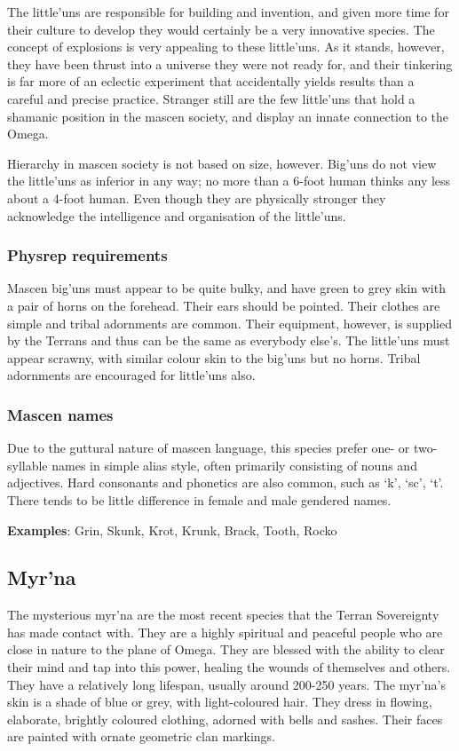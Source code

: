 The little'uns are responsible for building and invention, and given more time for their culture to develop they would certainly be a very innovative species. The concept of explosions is very appealing to these little'uns. As it stands, however, they have been thrust into a universe they were not ready for, and their tinkering is far more of an eclectic experiment that accidentally yields results than a careful and precise practice. Stranger still are the few little'uns that hold a shamanic position in the mascen society, and display an innate connection to the Omega.

Hierarchy in mascen society is not based on size, however. Big'uns do not view the little'uns as inferior in any way; no more than a 6-foot human thinks any less about a 4-foot human. Even though they are physically stronger they acknowledge the intelligence and organisation of the little'uns.

\subsubsection{Physrep requirements}

Mascen big'uns must appear to be quite bulky, and have green to grey skin with a pair of horns on the forehead. Their ears should be pointed. Their clothes are simple and tribal adornments are common. Their equipment, however, is supplied by the Terrans and thus can be the same as everybody else's. The little'uns must appear scrawny, with similar colour skin to the big'uns but no horns. Tribal adornments are encouraged for little'uns also.

\subsubsection{Mascen names}

Due to the guttural nature of mascen language, this species prefer one- or two-syllable names in simple alias style, often primarily consisting of nouns and adjectives. Hard consonants and phonetics are also common, such as `k', `sc', `t'. There tends to be little difference in female and male gendered names.

\textbf{Examples}: Grin, Skunk, Krot, Krunk, Brack, Tooth, Rocko

\subsection{Myr'na}

The mysterious myr'na are the most recent species that the Terran Sovereignty has made contact with. They are a highly spiritual and peaceful people who are close in nature to the plane of Omega. They are blessed with the ability to clear their mind and tap into this power, healing the wounds of themselves and others. They have a relatively long lifespan, usually around 200-250 years. The myr'na's skin is a shade of blue or grey, with light-coloured hair. They dress in flowing, elaborate, brightly coloured clothing, adorned with bells and sashes. Their faces are painted with ornate geometric clan markings.

